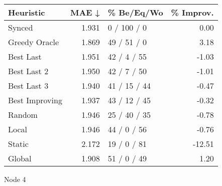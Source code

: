 \begin{tabular}{lrlr}
\toprule
\textbf{Heuristic} & \textbf{MAE ↓} & \textbf{\% Be/Eq/Wo} & \textbf{\% Improv.} \\
\midrule
            Synced &          1.931 &          0 / 100 / 0 &                0.00 \\
     Greedy Oracle &          1.869 &          49 / 51 / 0 &                3.18 \\
         Best Last &          1.951 &          42 / 4 / 55 &               -1.03 \\
       Best Last 2 &          1.950 &          42 / 7 / 50 &               -1.01 \\
       Best Last 3 &          1.940 &         41 / 15 / 44 &               -0.47 \\
    Best Improving &          1.937 &         43 / 12 / 45 &               -0.32 \\
            Random &          1.946 &         25 / 40 / 35 &               -0.78 \\
             Local &          1.946 &          44 / 0 / 56 &               -0.76 \\
            Static &          2.172 &          19 / 0 / 81 &              -12.51 \\
            Global &          1.908 &          51 / 0 / 49 &                1.20 \\
\bottomrule
\end{tabular}
\caption{Node 4}
\label{tab:ds_iid_lr05_le2_bs4_4}
